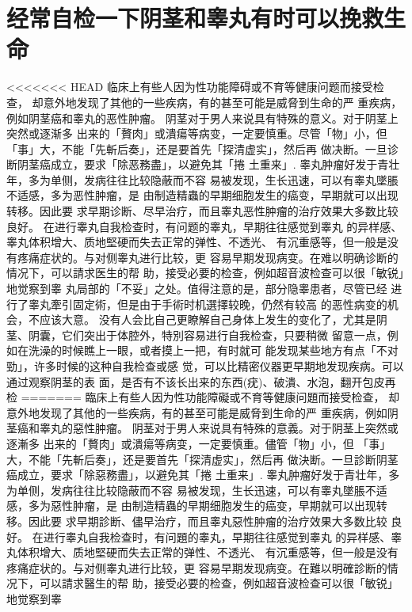 \documentclass[12pt,UTF8]{ctexbook}
\begin{document}
\section{经常自检一下阴茎和睾丸有时可以挽救生命}

<<<<<<< HEAD
临床上有些人因为性功能障碍或不育等健康问题而接受检查，
却意外地发现了其他的一些疾病，有的甚至可能是威脅到生命的严
重疾病，例如阴茎癌和睾丸的恶性肿瘤。
阴茎对于男人来说具有特殊的意义。对于阴茎上突然或逐渐多
出来的「贅肉」或潰瘍等病变，一定要慎重。尽管「物」小，但
「事」大，不能「先斬后奏」，还是要首先「探清虚实」，然后再
做决断。一旦诊断阴茎癌成立，要求「除恶務盡」，以避免其「捲
土重来」.
睾丸肿瘤好发于青壮年，多为单侧，发病往往比较隐蔽而不容
易被发现，生长迅速，可以有睾丸墜脹不适感，多为恶性肿瘤，是
由制造精蟲的早期细胞发生的癌变，早期就可以出现转移。因此要
求早期诊断、尽早治疗，而且睾丸恶性肿瘤的治疗效果大多数比较
良好。
在进行睾丸自我检查时，有问题的睾丸，早期往往感觉到睾丸
的异样感、睾丸体积增大、质地堅硬而失去正常的弹性、不透光、
有沉重感等，但一般是没有疼痛症状的。与对侧睾丸进行比较，更
容易早期发现病变。在难以明确诊断的情况下，可以請求医生的帮
助，接受必要的检查，例如超音波检查可以很「敏锐」地觉察到睾
丸局部的「不妥」之处。值得注意的是，部分隐睾患者，尽管已经
进行了睾丸牽引固定術，但是由于手術时机選擇较晚，仍然有较高
的恶性病变的机会，不应该大意。
没有人会比自己更瞭解自己身体上发生的变化了，尤其是阴
茎、阴囊，它们突出于体腔外，特別容易进行自我检查，只要稍微
留意一点，例如在洗澡的时候瞧上一眼，或者摸上一把，有时就可
能发现某些地方有点「不对勁」，许多时候的这种自我检查或感
觉，可以比精密仪器更早期地发现疾病。可以通过观察阴茎的表
面，是否有不该长出来的东西(疣)、破潰、水泡，翻开包皮再检
=======
臨床上有些人因为性功能障礙或不育等健康问題而接受检查，
却意外地发现了其他的一些疾病，有的甚至可能是威脅到生命的严
重疾病，例如阴茎癌和睾丸的惡性肿瘤。
阴茎对于男人来说具有特殊的意義。对于阴茎上突然或逐漸多
出来的「贅肉」或潰瘍等病变，一定要慎重。儘管「物」小，但
「事」大，不能「先斬后奏」，还是要首先「探清虚实」，然后再
做決断。一旦診断阴茎癌成立，要求「除惡務盡」，以避免其「捲
土重来」.
睾丸肿瘤好发于青壮年，多为单侧，发病往往比较隐蔽而不容
易被发现，生长迅速，可以有睾丸墜脹不适感，多为惡性肿瘤，是
由制造精蟲的早期细胞发生的癌变，早期就可以出现转移。因此要
求早期診断、儘早治疗，而且睾丸惡性肿瘤的治疗效果大多数比较
良好。
在进行睾丸自我检查时，有问題的睾丸，早期往往感觉到睾丸
的异样感、睾丸体积增大、质地堅硬而失去正常的弹性、不透光、
有沉重感等，但一般是没有疼痛症状的。与对侧睾丸进行比较，更
容易早期发现病变。在難以明確診断的情况下，可以請求醫生的帮
助，接受必要的检查，例如超音波检查可以很「敏锐」地觉察到睾
\end{document}
